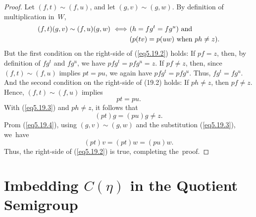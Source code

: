 \documentclass{surv-l}
\numberwithin{equation}{section}
\numberwithin{table}{section}
\numberwithin{figure}{section}
\theoremstyle{definition}
\begin{document}
\begin{proof}Let $(f,t)\sim(f, u)$, and let $(g, v)\sim(g, w)$. By
definition of multiplication in~$W$,
\begin{align}\label{eq5.19.2}
(f, t)(g, v)\sim(f, u)(g, w)\ \Longleftrightarrow\ &(h=fg^{t}=fg^{u})\ \mathrm{and}\notag\\
&(p(tv)=p(uw)\ \mathrm{when}\ ph\neq z).
\end{align}
But the first condition on the right-side of (\ref{eq5.19.2})
holds: If $pf=z$, then, by definition of $fg^{t}$ and $fg^{u}$, we
have $pfg^{t}=pfg^{u}=z$. If $pf\neq z$, then, since $(f,t)\sim(f,
u)$ implies $pt=pu$, we again have $pfg^{t}=pfg^{u}$. Thus,
$fg^{t}=fg^{u}$. And the second condition on the right-side of
(19.2) holds: If $ph\neq z$, then $pf\neq z$. Hence,
$(f,t)\sim(f,u)$ implies
\begin{equation}\label{eq5.19.3}
 pt=pu.
\end{equation}
With (\ref{eq5.19.3}) and $ph\neq z$, it follows that
\begin{equation}\label{eq5.19.4}
 (pt)g=(pu)g\neq z.
\end{equation}
Prom (\ref{eq5.19.4}), using $(g, v)\sim(g, w)$ and the
substitution (\ref{eq5.19.3}), we~have
\[
(pt)v=(pt)w=(pu)w.
\]
Thus, the right-side of (\ref{eq5.19.2}) is true, completing
the~proof.
\end{proof}

\section{Imbedding $C(\eta)$ in the Quotient Semigroup}\label{sec5.20}
\end{document}
